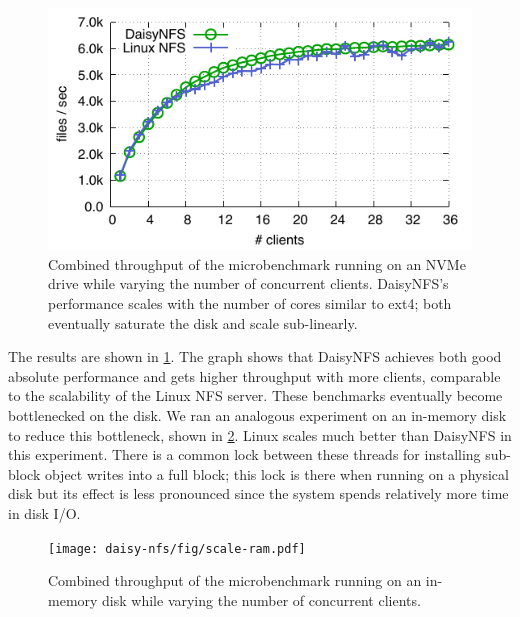 \begin{figure}
  \includegraphics{daisy-nfs/fig/scale.pdf}
  \caption[Concurrent smallfile performance]%
{Combined throughput of the  microbenchmark running on
    an NVMe drive while
    varying the number of concurrent clients. DaisyNFS's performance scales with the
    number of cores similar to ext4; both eventually saturate the disk and scale
    sub-linearly.}
  \label{fig:eval:scale}
\end{figure}

The results are shown in \cref{fig:eval:scale}. The graph shows that DaisyNFS
achieves both good absolute performance and gets higher throughput with more
clients, comparable to the scalability of the Linux NFS server. These benchmarks
eventually become bottlenecked on the disk. We ran an analogous experiment on an
in-memory disk to reduce this bottleneck, shown in \cref{fig:eval:scale-ram}.
Linux scales much better than DaisyNFS in this experiment. There is a common
lock between these threads for installing sub-block object writes into a full
block; this lock is there when running on a physical disk but its effect is less
pronounced since the system spends relatively more time in disk I/O.

\begin{figure}
  \texttt{[image: daisy-nfs/fig/scale-ram.pdf]}
  \caption[Concurrent smallfile performance, with RAM disk]%
  {Combined throughput of the  microbenchmark running on an
    in-memory disk while varying the number of concurrent clients. }
  \label{fig:eval:scale-ram}
\end{figure}

